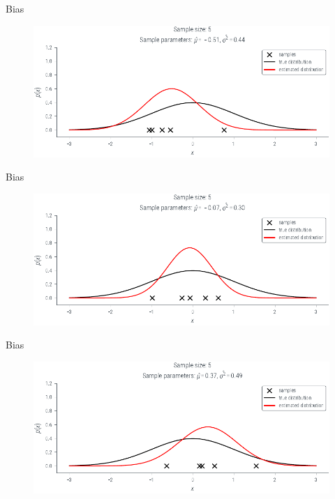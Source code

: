 \documentclass[handout]{beamer}
\begin{document}
             \begin{frame}{Bias }
            \begin{figure}
                \includegraphics{../figures/mle/biased-mle-normal-5-2.pdf}
            \end{figure}
            
        \end{frame}

             \begin{frame}{Bias }
            \begin{figure}
                \includegraphics{../figures/mle/biased-mle-normal-5-3.pdf}
            \end{figure}
            
        \end{frame}

             \begin{frame}{Bias }
            \begin{figure}
                \includegraphics{../figures/mle/biased-mle-normal-5-4.pdf}
            \end{figure}
            
        \end{frame}
\end{document}
